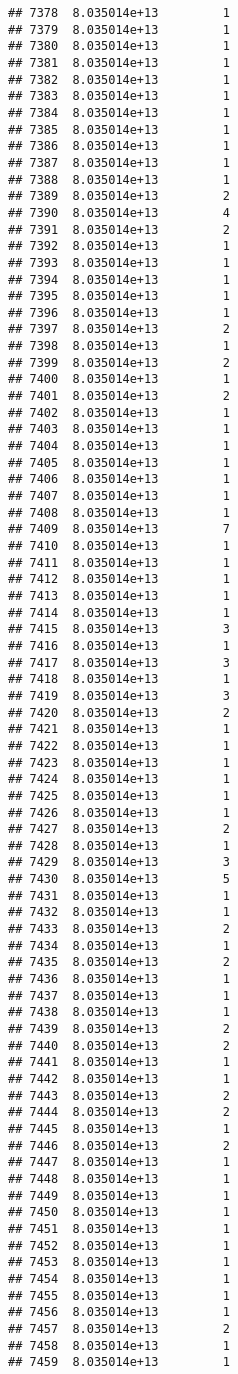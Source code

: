 \documentclass[
]{article}
\begin{document}
\begin{verbatim}
## 7378  8.035014e+13         1
## 7379  8.035014e+13         1
## 7380  8.035014e+13         1
## 7381  8.035014e+13         1
## 7382  8.035014e+13         1
## 7383  8.035014e+13         1
## 7384  8.035014e+13         1
## 7385  8.035014e+13         1
## 7386  8.035014e+13         1
## 7387  8.035014e+13         1
## 7388  8.035014e+13         1
## 7389  8.035014e+13         2
## 7390  8.035014e+13         4
## 7391  8.035014e+13         2
## 7392  8.035014e+13         1
## 7393  8.035014e+13         1
## 7394  8.035014e+13         1
## 7395  8.035014e+13         1
## 7396  8.035014e+13         1
## 7397  8.035014e+13         2
## 7398  8.035014e+13         1
## 7399  8.035014e+13         2
## 7400  8.035014e+13         1
## 7401  8.035014e+13         2
## 7402  8.035014e+13         1
## 7403  8.035014e+13         1
## 7404  8.035014e+13         1
## 7405  8.035014e+13         1
## 7406  8.035014e+13         1
## 7407  8.035014e+13         1
## 7408  8.035014e+13         1
## 7409  8.035014e+13         7
## 7410  8.035014e+13         1
## 7411  8.035014e+13         1
## 7412  8.035014e+13         1
## 7413  8.035014e+13         1
## 7414  8.035014e+13         1
## 7415  8.035014e+13         3
## 7416  8.035014e+13         1
## 7417  8.035014e+13         3
## 7418  8.035014e+13         1
## 7419  8.035014e+13         3
## 7420  8.035014e+13         2
## 7421  8.035014e+13         1
## 7422  8.035014e+13         1
## 7423  8.035014e+13         1
## 7424  8.035014e+13         1
## 7425  8.035014e+13         1
## 7426  8.035014e+13         1
## 7427  8.035014e+13         2
## 7428  8.035014e+13         1
## 7429  8.035014e+13         3
## 7430  8.035014e+13         5
## 7431  8.035014e+13         1
## 7432  8.035014e+13         1
## 7433  8.035014e+13         2
## 7434  8.035014e+13         1
## 7435  8.035014e+13         2
## 7436  8.035014e+13         1
## 7437  8.035014e+13         1
## 7438  8.035014e+13         1
## 7439  8.035014e+13         2
## 7440  8.035014e+13         2
## 7441  8.035014e+13         1
## 7442  8.035014e+13         1
## 7443  8.035014e+13         2
## 7444  8.035014e+13         2
## 7445  8.035014e+13         1
## 7446  8.035014e+13         2
## 7447  8.035014e+13         1
## 7448  8.035014e+13         1
## 7449  8.035014e+13         1
## 7450  8.035014e+13         1
## 7451  8.035014e+13         1
## 7452  8.035014e+13         1
## 7453  8.035014e+13         1
## 7454  8.035014e+13         1
## 7455  8.035014e+13         1
## 7456  8.035014e+13         1
## 7457  8.035014e+13         2
## 7458  8.035014e+13         1
## 7459  8.035014e+13         1

\end{verbatim}
\end{document}

